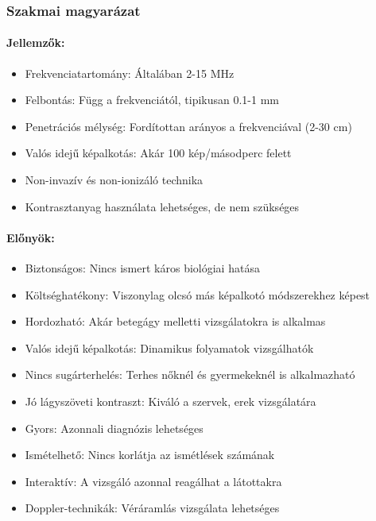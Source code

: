 \documentclass[a4paper,12pt]{article}
\begin{document}
\subsubsection{Szakmai magyarázat}

\paragraph{Jellemzők:} \begin{itemize} \item Frekvenciatartomány: Általában 2-15 MHz \item Felbontás: Függ a frekvenciától, tipikusan 0.1-1 mm \item Penetrációs mélység: Fordítottan arányos a frekvenciával (2-30 cm) \item Valós idejű képalkotás: Akár 100 kép/másodperc felett \item Non-invazív és non-ionizáló technika \item Kontrasztanyag használata lehetséges, de nem szükséges \end{itemize}

\paragraph{Előnyök:} \begin{itemize} \item Biztonságos: Nincs ismert káros biológiai hatása \item Költséghatékony: Viszonylag olcsó más képalkotó módszerekhez képest \item Hordozható: Akár betegágy melletti vizsgálatokra is alkalmas \item Valós idejű képalkotás: Dinamikus folyamatok vizsgálhatók \item Nincs sugárterhelés: Terhes nőknél és gyermekeknél is alkalmazható \item Jó lágyszöveti kontraszt: Kiváló a szervek, erek vizsgálatára \item Gyors: Azonnali diagnózis lehetséges \item Ismételhető: Nincs korlátja az ismétlések számának \item Interaktív: A vizsgáló azonnal reagálhat a látottakra \item Doppler-technikák: Véráramlás vizsgálata lehetséges \end{itemize}
\end{document}
